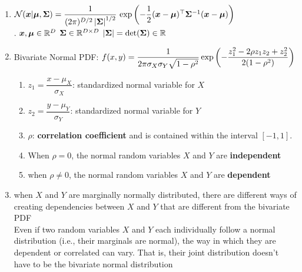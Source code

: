 \begin{enumerate}
    \item
    $
        \mathcal{N}(\bm{x}|\bm{\mu}, \bm{\Sigma})
        = \dfrac{1}{(2\pi)^{D/2} \left| \bm{\Sigma} \right|^{1/2}} \,
        \exp\left(
            -\dfrac{1}{2}
            (\bm{x} - \bm{\mu})^\top \bm{\Sigma}^{-1} (\bm{x} - \bm{\mu})
        \right)
    $
    \hfill \cite{ml/book/Pattern-Recognition-And-Machine-Learning/Christopher-M-Bishop}
    \\[0.2cm]
    .\hfill
    $\bm{x}, \bm{\mu} \in \mathbb{R}^D$
    \hfill
    $\bm{\Sigma} \in \mathbb{R}^{D \times D}$
    \hfill
    $\left| \bm{\Sigma} \right| = \det(\bm{\Sigma}) \in \mathbb{R}$
    \hfill \cite{ml/book/Pattern-Recognition-And-Machine-Learning/Christopher-M-Bishop}

    \item Bivariate Normal PDF:
    $
        f (x, y) 
        = \dfrac{1}{ 2\pi\sigma_X \sigma_Y \sqrt{1 - \rho^2} }
        \exp \left(
            - \dfrac{z^2_1 - 2\rho z_1z_2 + z^2_2 }{2(1 - \rho^2)}
        \right)
    $
    \hfill \cite{statistics/book/Statistics-for-Data-Scientists/Maurits-Kaptein}
    \begin{enumerate}
        \item $z_1 = \dfrac{x - \mu_X}{\sigma_X}$: standardized normal variable for $X$
        \hfill \cite{statistics/book/Statistics-for-Data-Scientists/Maurits-Kaptein}
        
        \item $z_2 = \dfrac{y - \mu_Y}{\sigma_Y}$: standardized normal variable for $Y$
        \hfill \cite{statistics/book/Statistics-for-Data-Scientists/Maurits-Kaptein}

        \item $\rho$: \textbf{correlation coefficient} and is contained within the interval $[-1, 1]$.
        \hfill \cite{statistics/book/Statistics-for-Data-Scientists/Maurits-Kaptein}

        \item When $\rho = 0$, the normal random variables $X$ and $Y$ are \textbf{independent}
        \hfill \cite{statistics/book/Statistics-for-Data-Scientists/Maurits-Kaptein}

        \item when $\rho \neq 0$, the normal random variables $X$ and $Y$ are \textbf{dependent}
        \hfill \cite{statistics/book/Statistics-for-Data-Scientists/Maurits-Kaptein}
    \end{enumerate}

    \item when $X$ and $Y$ are marginally normally distributed, there are different ways of creating dependencies between $X$ and $Y$ that are different from the bivariate PDF 
    \hfill \cite{statistics/book/Statistics-for-Data-Scientists/Maurits-Kaptein}
    \\
    Even if two random variables $X$ and $Y$ each individually follow a normal distribution (i.e., their marginals are normal), the way in which they are dependent or correlated can vary. 
    That is, their joint distribution doesn't have to be the bivariate normal distribution
    \hfill \cite{common/online/chatgpt}
\end{enumerate}

